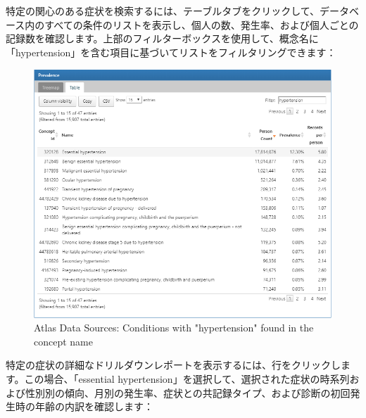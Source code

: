 \documentclass[
  11pt]{book}
\theoremstyle{definition}
\theoremstyle{definition}
\theoremstyle{definition}
\theoremstyle{definition}
\theoremstyle{remark}
\begin{document}
特定の関心のある症状を検索するには、テーブルタブをクリックして、データベース内のすべての条件のリストを表示し、個人の数、発生率、および個人ごとの記録数を確認します。上部のフィルターボックスを使用して、概念名に「hypertension」を含む項目に基づいてリストをフィルタリングできます：

\begin{figure}

{\centering \includegraphics[width=1\linewidth]{images/Characterization/atlasDataSourcesConditionFiltered} 

}

\caption{Atlas Data Sources: Conditions with "hypertension" found in the concept name}\label{fig:atlasDataSourcesConditionFiltered}
\end{figure}

特定の症状の詳細なドリルダウンレポートを表示するには、行をクリックします。この場合、「essential hypertension」を選択して、選択された症状の時系列および性別別の傾向、月別の発生率、症状との共記録タイプ、および診断の初回発生時の年齢の内訳を確認します：
\end{document}
